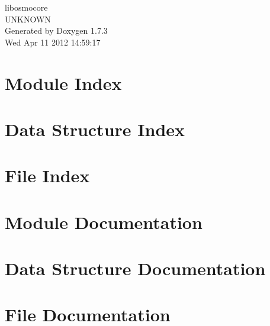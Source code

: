 \documentclass[a4paper]{book}
\begin{document}
\begin{titlepage}
\vspace*{7cm}
\begin{center}
{\Large libosmocore \\[1ex]\large UNKNOWN }\\
\vspace*{1cm}
{\large Generated by Doxygen 1.7.3}\\
\vspace*{0.5cm}
{\small Wed Apr 11 2012 14:59:17}\\
\end{center}
\end{titlepage}
\clearemptydoublepage
{}
\tableofcontents
\clearemptydoublepage
{}
\chapter{Module Index}

\chapter{Data Structure Index}

\chapter{File Index}

\chapter{Module Documentation}

\chapter{Data Structure Documentation}




\chapter{File Documentation}








\printindex
\end{document}
